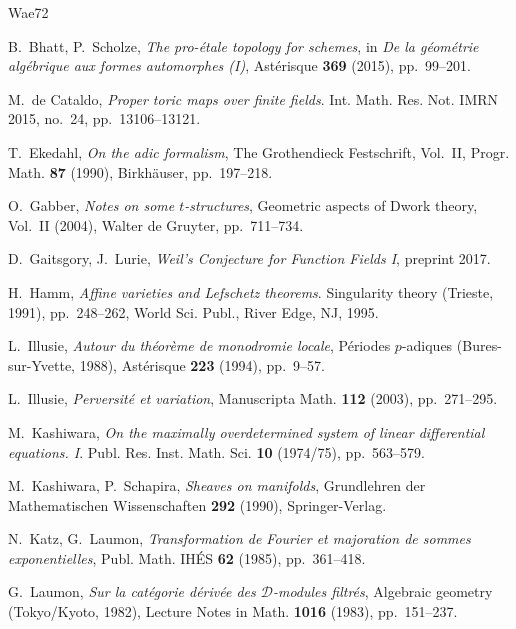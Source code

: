 \documentclass[12pt,oneside]{amsbook}
\theoremstyle{plain}
\theoremstyle{definition}
\begin{document}
\renewcommand{\bibname}{Additional Bibliography}
\begin{thebibliography}{Wae72}
 B.~Bhatt, P.~Scholze, \emph{The pro-étale topology for schemes}, in \emph{De la géométrie algébrique aux formes automorphes (I)}, Astérisque \textbf{369} (2015), pp.~99--201.

 M.~de Cataldo, \emph{Proper toric maps over finite fields}. Int. Math. Res. Not. IMRN 2015, no.~24, pp.~13106--13121.

 T.~Ekedahl, \emph{On the adic formalism}, The Grothendieck Festschrift, Vol.~II, Progr. Math. \textbf{87} (1990), Birkhäuser, pp.~197--218.

 O.~Gabber, \emph{Notes on some $t$-structures}, Geometric aspects of Dwork theory, Vol.~II (2004), Walter de Gruyter, pp.~711--734.

 D.~Gaitsgory, J.~Lurie, \emph{Weil's Conjecture for Function Fields I}, preprint 2017.

 H.~Hamm, \emph{Affine varieties and Lefschetz theorems}. Singularity theory (Trieste, 1991), pp.~248--262, World Sci. Publ., River Edge, NJ, 1995.

 L.~Illusie, \emph{Autour du théorème de monodromie locale}, Périodes $p$-adiques (Bures-sur-Yvette, 1988), Astérisque \textbf{223} (1994), pp.~9--57.

 L.~Illusie, \emph{Perversité et variation}, Manuscripta Math. \textbf{112} (2003), pp.~271--295.

 M.~Kashiwara, \emph{On the maximally overdetermined system of linear differential equations. I}. Publ. Res. Inst. Math. Sci. \textbf{10} (1974/75), pp.~563--579.

 M.~Kashiwara, P.~Schapira, \emph{Sheaves on manifolds}, Grundlehren der Mathematischen Wissenschaften \textbf{292} (1990), Springer-Verlag.

 N.~Katz, G.~Laumon, \emph{Transformation de Fourier et majoration de sommes exponentielles}, Publ. Math. IHÉS \textbf{62} (1985), pp.~361--418.

 G.~Laumon, \emph{Sur la catégorie dérivée des $\mathcal{D}$-modules filtrés}, Algebraic geometry (Tokyo/Kyoto, 1982), Lecture Notes in Math. \textbf{1016} (1983), pp.~151--237.


\end{thebibliography}
\end{document}
